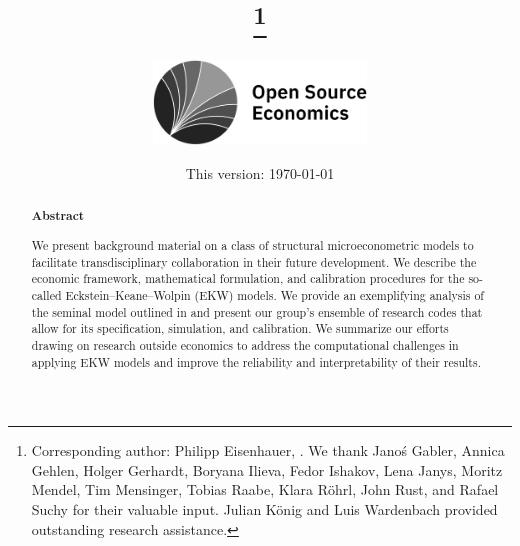 
\begin{titlepage}

\title{%
	\sffamily\bfseries%
	\papertitle%
	\thanks{Corresponding author: Philipp Eisenhauer, . We thank Jano\'s Gabler, Annica Gehlen, Holger Gerhardt, Boryana Ilieva, Fedor Ishakov, Lena Janys, Moritz Mendel, Tim Mensinger, Tobias Raabe, Klara R\"ohrl, John Rust, and Rafael Suchy for their valuable input. Julian König and Luis Wardenbach provided outstanding research assistance.}
}

\author{%
	\bigskip%
	\includegraphics[height=2.25cm]{../material/OSE_logo_gray.pdf}
	\bigskip%
}

\date{%
	\normalsize%
	This version: \today%
}


\maketitle

\begin{abstract}
\begin{center}\textsf{\textbf{Abstract}}\end{center}\medskip
\noindent We present background material on a class of structural microeconometric models to facilitate transdisciplinary collaboration in their future development. We describe the economic framework, mathematical formulation, and calibration procedures for the so-called Eckstein--Keane--Wolpin (EKW) models. We provide an exemplifying analysis of the seminal model outlined in \citet{Keane.1997} and present our group's ensemble of research codes that allow for its specification, simulation, and calibration. We summarize our efforts drawing on research outside economics to
address the computational challenges in applying EKW models and improve the reliability and interpretability of their results.
\end{abstract}


\thispagestyle{empty}

\end{titlepage}

\setcounter{page}{2}

\tableofcontents

\clearpage
